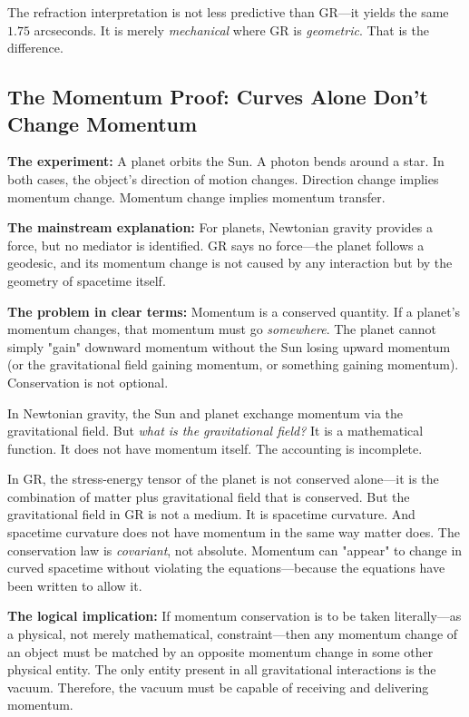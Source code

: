 \documentclass[12pt, a4paper]{article}
\begin{document}
The refraction interpretation is not less predictive than GR—it yields the same \(1.75\) arcseconds. It is merely \textit{mechanical} where GR is \textit{geometric}. That is the difference.

\subsection{The Momentum Proof: Curves Alone Don't Change Momentum}
\label{subsec:momentum_proof}

\textbf{The experiment:} A planet orbits the Sun. A photon bends around a star. In both cases, the object's direction of motion changes. Direction change implies momentum change. Momentum change implies momentum transfer.

\textbf{The mainstream explanation:} For planets, Newtonian gravity provides a force, but no mediator is identified. GR says no force—the planet follows a geodesic, and its momentum change is not caused by any interaction but by the geometry of spacetime itself.

\textbf{The problem in clear terms:} Momentum is a conserved quantity. If a planet's momentum changes, that momentum must go \textit{somewhere}. The planet cannot simply "gain" downward momentum without the Sun losing upward momentum (or the gravitational field gaining momentum, or something gaining momentum). Conservation is not optional.

In Newtonian gravity, the Sun and planet exchange momentum via the gravitational field. But \textit{what is the gravitational field?} It is a mathematical function. It does not have momentum itself. The accounting is incomplete.

In GR, the stress-energy tensor of the planet is not conserved alone—it is the combination of matter plus gravitational field that is conserved. But the gravitational field in GR is not a medium. It is spacetime curvature. And spacetime curvature does not have momentum in the same way matter does. The conservation law is \textit{covariant}, not absolute. Momentum can "appear" to change in curved spacetime without violating the equations—because the equations have been written to allow it.

\textbf{The logical implication:} If momentum conservation is to be taken literally—as a physical, not merely mathematical, constraint—then any momentum change of an object must be matched by an opposite momentum change in some other physical entity. The only entity present in all gravitational interactions is the vacuum. Therefore, the vacuum must be capable of receiving and delivering momentum.
\end{document}
